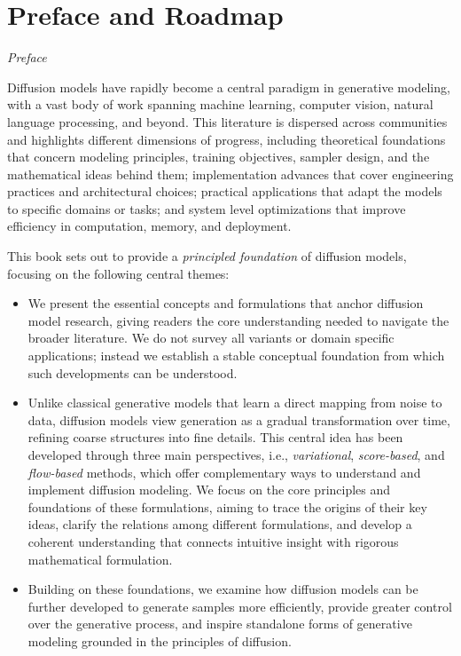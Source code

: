 \chapter*{Preface and Roadmap}
{\sffamily\slshape Preface}


Diffusion models have rapidly become a central paradigm in generative modeling, with a vast body of work spanning machine learning, computer vision, natural language processing, and beyond. This literature is dispersed across communities and highlights different dimensions of progress, including theoretical foundations that concern modeling principles, training objectives, sampler design, and the mathematical ideas behind them; implementation advances that cover engineering practices and architectural choices; practical applications that adapt the models to specific domains or tasks; and system level optimizations that improve efficiency in computation, memory, and deployment.


This book sets out to provide a \emph{principled foundation} of diffusion models, focusing on the following central themes:
\begin{itemize}
    \item We present the essential concepts and formulations that anchor diffusion model research, giving readers the core understanding needed to navigate the broader literature. We do not survey all variants or domain specific applications; instead we establish a stable conceptual foundation from which such developments can be understood.
    \item Unlike classical generative models that learn a direct mapping from noise to data, diffusion models view generation as a gradual transformation over time, refining coarse structures into fine details. This central idea has been developed through three main perspectives, i.e., \emph{variational}, \emph{score-based}, and \emph{flow-based} methods, which offer complementary ways to understand and implement diffusion modeling. We focus on the core principles and foundations of these formulations, aiming to trace the origins of their key ideas, clarify the relations among different formulations, and develop a coherent understanding that connects intuitive insight with rigorous mathematical formulation.
    \item Building on these foundations, we examine how diffusion models can be further developed to generate samples more efficiently, provide greater control over the generative process, and inspire standalone forms of generative modeling grounded in the principles of diffusion.
\end{itemize}


